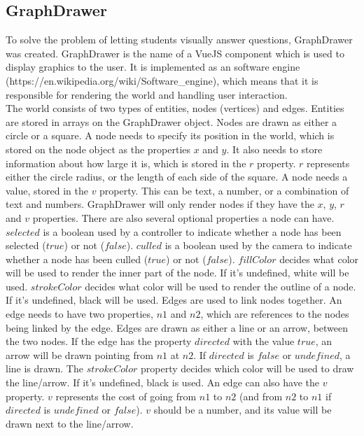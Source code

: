 \subsection{GraphDrawer}
To solve the problem of letting students visually answer questions, GraphDrawer was created. GraphDrawer is the name of a VueJS component which is used to display graphics to the user. It is implemented as an software engine (https://en.wikipedia.org/wiki/Software\_engine), which means that it is responsible for rendering the world and handling user interaction. 
\\[11pt]
The world consists of two types of entities, nodes (vertices) and edges. Entities are stored in arrays on the GraphDrawer object. Nodes are drawn as either a circle or a square. A node needs to specify its position in the world, which is stored on the node object as the properties $x$ and $y$. It also needs to store information about how large it is, which is stored in the $r$ property. $r$ represents either the circle radius, or the length of each side of the square. A node needs a value, stored in the $v$ property. This can be text, a number, or a combination of text and numbers. GraphDrawer will only render nodes if they have the $x$, $y$, $r$ and $v$ properties. There are also several optional properties a node can have. $selected$ is a boolean used by a controller to indicate whether a node has been selected ($true$) or not ($false$). $culled$ is a boolean used by the camera to indicate whether a node has been culled ($true$) or not ($false$). $fillColor$ decides what color will be used to render the inner part of the node. If it's undefined, white will be used. $strokeColor$ decides  what color will be used to render the outline of a node. If it's undefined, black will be used. Edges are used to link nodes together. An edge needs to have two properties, $n1$ and $n2$, which are references to the nodes being linked by the edge. Edges are drawn as either a line or an arrow, between the two nodes. If the edge has the property $directed$ with the value $true$, an arrow will be drawn pointing from $n1$ at $n2$. If $directed$ is $false$ or $undefined$, a line is drawn. The $strokeColor$ property decides which color will be used to draw the line/arrow. If it's undefined, black is used. An edge can also have the $v$ property. $v$ represents the cost of going from $n1$ to $n2$ (and from $n2$ to $n1$ if $directed$ is $undefined$ or $false$). $v$ should be a number, and its value will be drawn next to the line/arrow.
\\[11pt]
